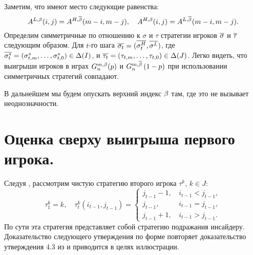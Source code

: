 Заметим, что имеют место следующие равенства:
\begin{equation*}
  A^{L,\Co}(i, j) = A^{H,\DCo}(m-i, m-j), \quad
  A^{H,\Co}(i, j) = A^{L,\DCo}(m-i, m-j).
\end{equation*}
Определим симметричные по отношению к $\sigma$ и $\tau$ стратегии игроков
$\symm{\sigma}$ и $\symm{\tau}$ следующим образом. Для $t$-го шага
$\symm{\sigma_t} = (\symm{\sigma^H_t}, \symm{\sigma^L})$, где
$\symm{\sigma^s_t}=(\sigma^s_{t,m},\ldots,\sigma^s_{t,0}) \in \Delta(I)$, и
$\symm{\tau_t} = (\tau_{t,m},\ldots,\tau_{t,0}) \in \Delta(J)$. Легко видеть,
что выигрыши игроков в играх $G^{m,\Co}_n(p)$ и $\symmGameExpression[n]{1-p}$
при использовании симметричных стратегий совпадают.

В дальнейшем мы будем опускать верхний индекс $\Co$ там, где это не вызывает неоднозначности.

\section{Оценка сверху выигрыша первого игрока.}
Следуя \cite{domansky07}, рассмотрим чистую стратегию второго игрока $\tau^k, \,
k \in J$:
\[
  \tau^k_1 = k, \quad \tau^k_t(i_{t-1}, j_{t-1}) = \begin{cases}
    j_{t-1} - 1, & \, i_{t-1} < j_{t-1}, \\
    j_{t-1},     & \, i_{t-1} = j_{t-1}, \\
    j_{t-1} + 1, & \, i_{t-1} > j_{t-1}.
  \end{cases}
\]
По сути эта стратегия представляет собой стратегию подражания инсайдеру.
Доказательство следующего утверждения по форме повторяет доказательство
утверждения 4.3 из \cite{domansky07} и приводится в целях иллюстрации.

